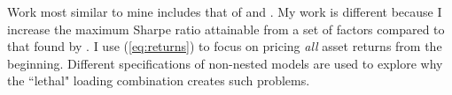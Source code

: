 Work most similar to mine includes that of \textcite{fama2016choosing} and
\textcite{barillas2015comparing}.
My work is different because I increase the maximum Sharpe ratio attainable 
from a set of factors compared to that found by \textcite{fama2016choosing}.
I use (\ref{eq:returns}) to focus on pricing \emph{all} asset returns from the 
beginning.
Different specifications of non-nested models are used to explore why the 
``lethal" loading combination creates such problems.

